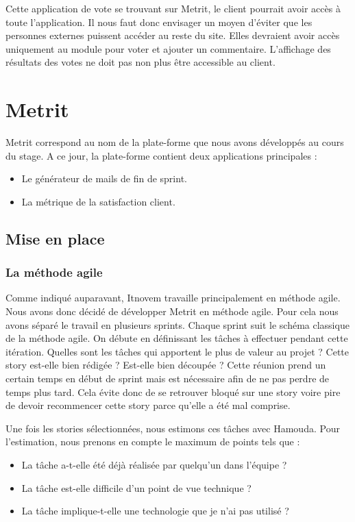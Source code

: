 \documentclass[12pt, twoside, openright]{report}
\begin{document}
Cette application de vote se trouvant sur Metrit, le client pourrait avoir accès à toute l'application. Il nous faut donc envisager un moyen d'éviter que les personnes externes puissent accéder au reste du site. Elles devraient avoir accès uniquement au module pour voter et ajouter un commentaire. L'affichage des résultats des votes ne doit pas non plus être accessible au client.

\leavevmode\thispagestyle{empty}\newpage
\leavevmode\thispagestyle{empty}\newpage

\chapter{Metrit}

Metrit correspond au nom de la plate-forme que nous avons développés au cours du stage. A ce jour, la plate-forme contient deux applications principales : 
\begin{itemize}
\item Le générateur de mails de fin de sprint.
\item La métrique de la satisfaction client.
\end{itemize}

\section{Mise en place}

\subsection{La méthode agile}
Comme indiqué auparavant, Itnovem travaille principalement en méthode agile. Nous avons donc décidé de développer Metrit en méthode agile. Pour cela nous avons séparé le travail en plusieurs sprints. Chaque sprint suit le schéma classique de la méthode agile. On débute en définissant les tâches à effectuer pendant cette itération. Quelles sont les tâches qui apportent le plus de valeur au projet ? Cette story est-elle bien rédigée ? Est-elle bien découpée ? Cette réunion prend un certain temps en début de sprint mais est nécessaire afin de ne pas perdre de temps plus tard. Cela évite donc de se retrouver bloqué sur une story voire pire de devoir recommencer cette story parce qu’elle a été mal comprise.

Une fois les stories sélectionnées, nous estimons ces tâches avec Hamouda. Pour l'estimation, nous prenons en compte le maximum de points tels que : 
\begin{itemize}
\item La tâche a-t-elle été déjà réalisée par quelqu'un dans l'équipe ?
\item La tâche est-elle difficile d'un point de vue technique ?
\item La tâche implique-t-elle une technologie que je n'ai pas utilisé ?
\end{itemize}
\end{document}
